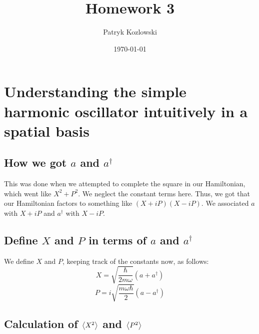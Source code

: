 \documentclass[12pt]{article}
\title{Homework 3}
\author{Patryk Kozlowski}
\date{\today}
\begin{document}
\maketitle


\section{Understanding the simple harmonic oscillator intuitively in a spatial basis}

\subsection{How we got \(a\) and \(a^{\dagger}\)}
This was done when we attempted to complete the square in our Hamiltonian, which went like $X^{2}+P^{2}$. We neglect the constant terms here. Thus, we got that our Hamiltonian factors to something like $(X+iP)(X-iP)$. We associated $a$ with $X+iP$ and $a^{\dagger}$ with $X-iP$.
\subsection{Define \(X\) and \(P\) in terms of \(a\) and \(a^{\dagger}\)}

We define \(X\) and \(P\), keeping track of the constants now, as follows:
\begin{equation}
    X = \sqrt{\frac{\hbar}{2m\omega}}(a + a^{\dagger})
\end{equation}
\begin{equation}
    P = i\sqrt{\frac{m\omega\hbar}{2}}(a - a^{\dagger})
\end{equation}
\subsection{Calculation of \(\ev{X^2}\) and \(\ev{P^2}\)}
\end{document}
